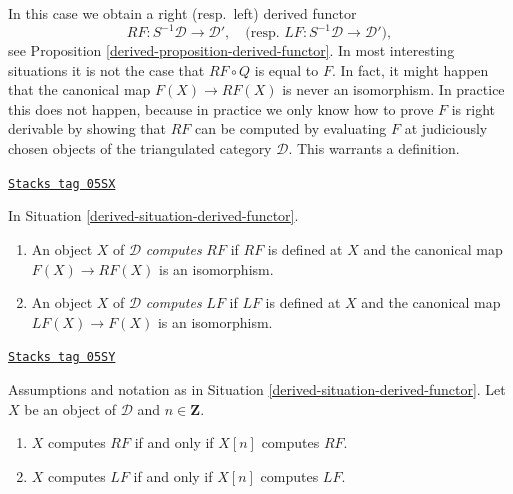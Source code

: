 In this case we obtain a right (resp.\ left) derived functor
\begin{equation}
\label{equation-everywhere}
RF : S^{-1}\mathcal{D} \longrightarrow \mathcal{D}',
\quad\text{(resp. }
LF : S^{-1}\mathcal{D} \longrightarrow \mathcal{D}'),
\end{equation}
see
Proposition \ref{derived-proposition-derived-functor}.
In most interesting situations it is not the case that $RF \circ Q$ is
equal to $F$. In fact, it might happen that the canonical map
$F(X) \to RF(X)$ is never an isomorphism. In practice this does not happen,
because in practice we only know how to prove $F$ is right derivable by
showing that $RF$ can be computed by evaluating $F$ at judiciously chosen
objects of the triangulated category $\mathcal{D}$. This warrants
a definition.

\begin{definition}[Computes]
\label{derived-definition-computes}
\href{https://stacks.math.columbia.edu/tag/05SX}{\texttt{Stacks tag 05SX}}

In
Situation \ref{derived-situation-derived-functor}.
\begin{enumerate}
\item An object $X$ of $\mathcal{D}$ {\it computes} $RF$ if $RF$ is defined
at $X$ and the canonical map $F(X) \to RF(X)$ is an isomorphism.
\item An object $X$ of $\mathcal{D}$ {\it computes} $LF$ if $LF$ is defined
at $X$ and the canonical map $LF(X) \to F(X)$ is an isomorphism.
\end{enumerate}
\end{definition}

\begin{lemma}
\label{derived-lemma-computes-shift}
\href{https://stacks.math.columbia.edu/tag/05SY}{\texttt{Stacks tag 05SY}}

Assumptions and notation as in
Situation \ref{derived-situation-derived-functor}.
Let $X$ be an object of $\mathcal{D}$ and $n \in \mathbf{Z}$.
\begin{enumerate}
\item $X$ computes $RF$ if and only if $X[n]$ computes $RF$.
\item $X$ computes $LF$ if and only if $X[n]$ computes $LF$.
\end{enumerate}
\end{lemma}

